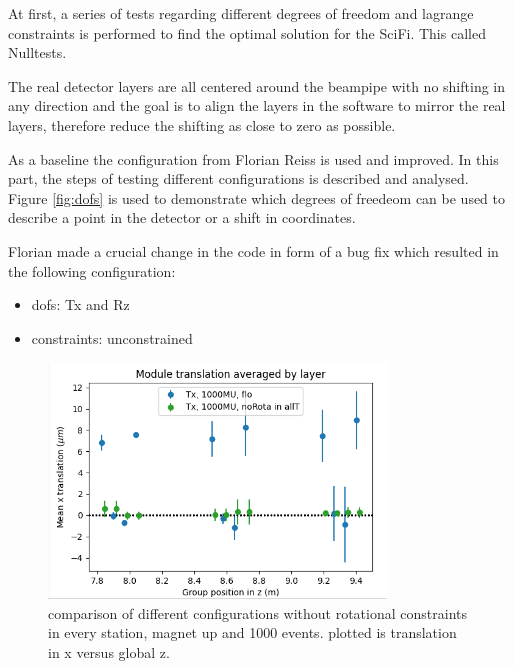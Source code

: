 

At first, a series of tests regarding different degrees of freedom and lagrange constraints is performed to find the optimal solution for the SciFi. This called Nulltests.

The real detector layers are all centered around the beampipe with no shifting in any direction and the goal is to align the layers in the software to mirror the real layers, therefore reduce the shifting as close to zero as possible.

As a baseline the configuration from Florian Reiss is used and improved.
In this part, the steps of testing different configurations is described and analysed.
Figure \ref{fig:dofs} is used to demonstrate which degrees of freedeom can be used
to describe a point in the detector or a shift in coordinates.

Florian made a crucial change in the code in form of a bug fix which resulted
in the following configuration:

\begin{itemize}
  \item dofs: Tx and Rz
  \item constraints: unconstrained
\end{itemize}

\begin{figure}
  \centering
  \includegraphics[width=0.8\textwidth]{plots/june_21/Tx_noRota_allT_1000MU.png}
  \caption{comparison of different configurations without rotational constraints in every station, magnet up and 1000 events. plotted is translation in x versus global z.}
  \label{fig:june_2}
\end{figure}

